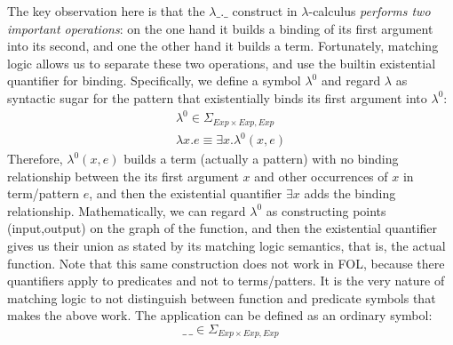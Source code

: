 \documentclass[UTF8,11pt]{article}
\theoremstyle{plain}
\theoremstyle{definition}
\theoremstyle{remark}
\newcommand{\Exp}{\textit{Exp}}
\begin{document}
The key observation here is that the $\lambda\_.\_$ construct in
$\lambda$-calculus \emph{performs two important operations}: on the one hand
it builds a binding of its first argument into its second, and one the other
hand it builds a term.
Fortunately, matching logic allows us to separate these two operations, and
use the builtin existential quantifier for binding.
Specifically, we define a symbol $\lambda^0$ and regard $\lambda$ as syntactic
sugar for the pattern that existentially binds its first argument into $\lambda^0$:
$$
\begin{array}{l}
\lambda^0 \in \Sigma_{\Exp\times\Exp,\Exp} \\
\lambda x . e \equiv \exists x . \lambda^0(x,e)
\end{array}
$$
Therefore, $\lambda^0(x,e)$ builds a term (actually a pattern) with no binding
relationship between the its first argument $x$ and other occurrences of $x$ in
term/pattern $e$, and then the existential quantifier $\exists x$ adds the binding
relationship.
Mathematically, we can regard $\lambda^0$ as constructing points (input,output)
on the graph of the function, and then the existential quantifier gives us their
union as stated by its matching logic semantics, that is, the actual function.
Note that this same construction does not work in FOL, because there quantifiers
apply to predicates and not to terms/patters.
It is the very nature of matching logic to not distinguish between function
and predicate symbols that makes the above work.
The application can be defined as an ordinary symbol:
$$
\_\,\_ \in \Sigma_{\Exp \times \Exp,\Exp}
$$
\end{document}
